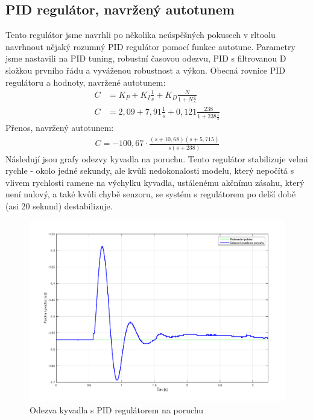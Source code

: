 \documentclass[11pt,a4paper]{article}
\begin{document}
\subsection{PID regulátor, navržený autotunem}
Tento regulátor jsme navrhli po několika neúspěšných pokusech v rltoolu navrhnout nějaký rozumný PID regulátor pomocí funkce autotune. Parametry jsme nastavili na PID tuning, robustní časovou odezvu, PID s filtrovanou D složkou prvního řádu a vyváženou robustnost a výkon.
\newline
Obecná rovnice PID regulátoru a hodnoty, navržené autotunem:
\begin{align*}
C &= K_P + K_I\frac{1}{s} + K_D\frac{N}{1+N\frac{1}{s}}	\\
C &= 2,09 + 7,91\frac{1}{s} + 0,121\frac{238}{1 + 238\frac{1}{s}}
\end{align*}
Přenos, navržený autotunem:
\begin{align*}
C = -100,67\cdot\frac{(s+10,68)(s+5,715)}{s(s+238)}
\end{align*}
Následují jsou grafy odezvy kyvadla na poruchu. Tento regulátor stabilizuje velmi rychle - okolo jedné sekundy, ale kvůli nedokonalosti modelu, který nepočítá s vlivem rychlosti ramene na výchylku kyvadla, ustálenému akčnímu zásahu, který není nulový, a také kvůli chybě senzoru, se systém s regulátorem po delší době (asi 20 sekund) destabilizuje.
\begin{figure}[H]
	\centering
    \includegraphics[scale=0.55]{odezva_kyvadlo_PID}
    \caption{Odezva kyvadla s PID regulátorem na poruchu}
\end{figure}
\end{document}
